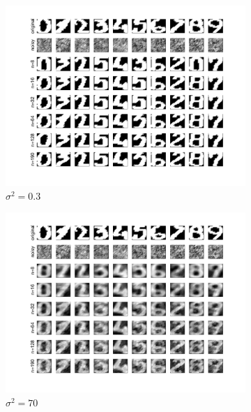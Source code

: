 \documentclass[a4paper, 11pt, one column]{article}
\begin{document}
\begin{figure}[H]
        \begin{subfigure}{0.33\textwidth}
            \includegraphics[width=\linewidth]{images/very_low_sigma_0.sth.png}
            \caption{$\sigma^2 = 0.3$}
        \end{subfigure}
        \begin{subfigure}{0.33\textwidth}
            \includegraphics[width=\linewidth]{images/high_sigma_70.png}
            \caption{$\sigma^2 = 70$}
        \end{subfigure}
        \begin{subfigure}{0.33\textwidth}

\end{subfigure}
\end{figure}
\end{document}
